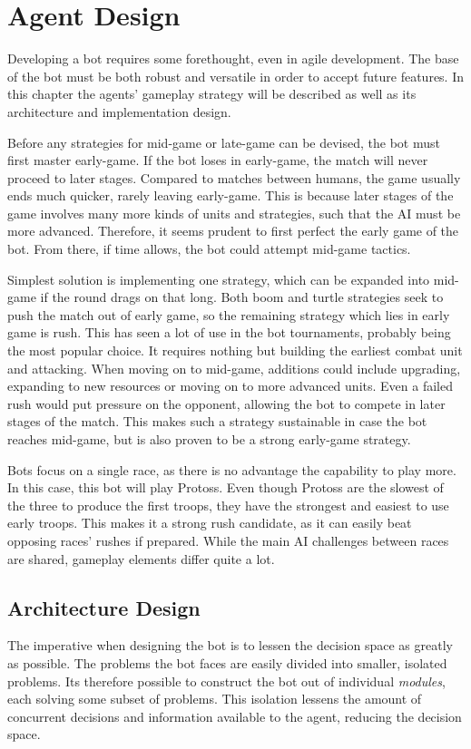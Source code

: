 \chapter{Agent Design}
\label{ch:design}
Developing a bot requires some forethought, even in agile development. The base of the bot must be both robust and versatile in order to accept future features. In this chapter the agents' gameplay strategy will be described as well as its architecture and implementation design.

Before any strategies for mid-game or late-game can be devised, the bot must first master early-game. If the bot loses in early-game, the match will never proceed to later stages. Compared to matches between humans, the game usually ends much quicker, rarely leaving early-game. This is because later stages of the game involves many more kinds of units and strategies, such that the AI must be more advanced. Therefore, it seems prudent to first perfect the early game of the bot. From there, if time allows, the bot could attempt mid-game tactics.

Simplest solution is implementing one strategy, which can be expanded into mid-game if the round drags on that long. Both boom and turtle strategies seek to push the match out of early game, so the remaining strategy which lies in early game is rush. This has seen a lot of use in the bot tournaments, probably being the most popular choice. It requires nothing but building the earliest combat unit and attacking. When moving on to mid-game, additions could include upgrading, expanding to new resources or moving on to more advanced units. Even a failed rush would put pressure on the opponent, allowing the bot to compete in later stages of the match. This makes such a strategy sustainable in case the bot reaches mid-game, but is also proven to be a strong early-game strategy.

Bots focus on a single race, as there is no advantage the capability to play more. In this case, this bot will play Protoss. Even though Protoss are the slowest of the three to produce the first troops, they have the strongest and easiest to use early troops. This makes it a strong rush candidate, as it can easily beat opposing races' rushes if prepared. While the main AI challenges between races are shared, gameplay elements differ quite a lot.

\section{Architecture Design}
The imperative when designing the bot is to lessen the decision space as greatly as possible. The problems the bot faces are easily divided into smaller, isolated problems. Its therefore possible to construct the bot out of individual \emph{modules}, each solving some subset of problems. This isolation lessens the amount of concurrent decisions and information available to the agent, reducing the decision space.

